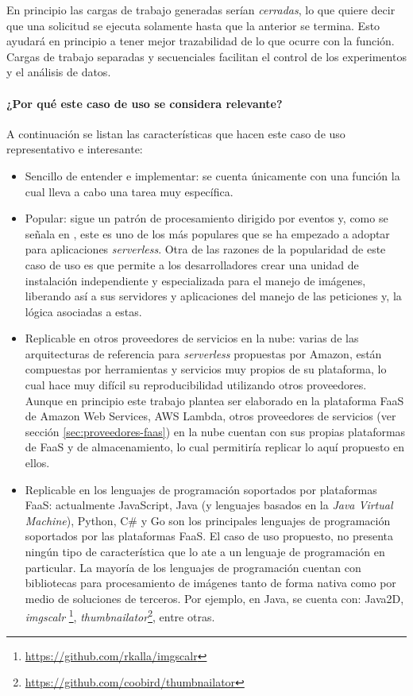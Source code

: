 En principio las cargas de trabajo generadas serían \emph{cerradas}, lo que quiere decir que una solicitud se ejecuta solamente hasta que la anterior se termina. Esto ayudará en principio a tener mejor trazabilidad de lo que ocurre con la función. Cargas de trabajo separadas y secuenciales facilitan el control de los experimentos y el análisis de datos.

\paragraph{¿Por qué este caso de uso se considera relevante?}
A continuación se listan las características que hacen este caso de uso representativo e interesante:
\begin{itemize}
    \item Sencillo de entender e implementar: se cuenta únicamente con una función la cual lleva a cabo una tarea muy específica.
    \item Popular: sigue un patrón de procesamiento dirigido por eventos y, como se señala en \cite{serverless-architecture-patterns}, este es uno de los más populares que se ha empezado a adoptar para aplicaciones \emph{serverless}. Otra de las razones de la popularidad de este caso de uso es que permite a los desarrolladores crear una unidad de instalación independiente y especializada para el manejo de imágenes, liberando así a sus servidores y aplicaciones del manejo de las peticiones y, la lógica asociadas a estas.
    \item Replicable en otros proveedores de servicios en la nube: varias de las arquitecturas de referencia para \emph{serverless} propuestas por Amazon, están compuestas por herramientas y servicios muy propios de su plataforma, lo cual hace muy difícil su reproducibilidad utilizando otros proveedores. Aunque en principio este trabajo plantea ser elaborado en la plataforma FaaS de Amazon Web Services, AWS Lambda, otros proveedores de servicios (ver sección \ref{sec:proveedores-faas}) en la nube cuentan con sus propias plataformas de FaaS y de almacenamiento, lo cual permitiría replicar lo aquí propuesto en ellos.
    \item Replicable en los lenguajes de programación soportados por plataformas FaaS: actualmente JavaScript, Java (y lenguajes basados en la \emph{Java Virtual Machine}), Python, C\# y Go son los principales lenguajes de programación soportados por las plataformas FaaS. El caso de uso propuesto, no presenta ningún tipo de característica que lo ate a un lenguaje de programación en particular. La mayoría de los lenguajes de programación cuentan con bibliotecas para procesamiento de imágenes tanto de forma nativa como por medio de soluciones de terceros. Por ejemplo, en Java, se cuenta con: Java2D, \emph{imgscalr} \footnote{\url{https://github.com/rkalla/imgscalr}}, \emph{thumbnailator}\footnote{\url{https://github.com/coobird/thumbnailator}}, entre otras.
\end{itemize}


